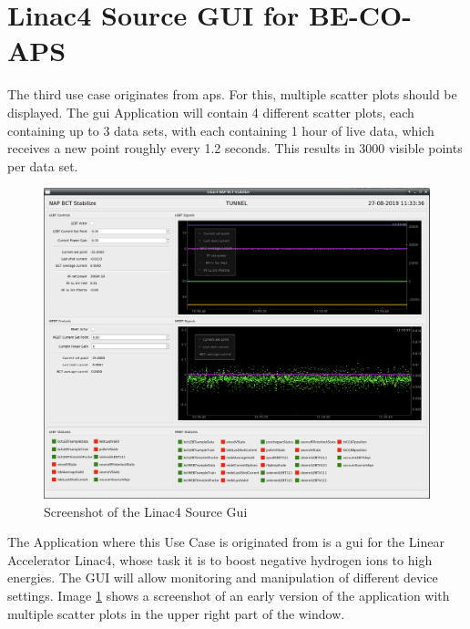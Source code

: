 \section{Linac4 Source GUI for BE-CO-APS}
\label{sec:usecases:linac}

The third use case originates from \gls{aps}. For this, multiple scatter plots
should be displayed. The \gls{gui} Application will contain 4 different scatter
plots, each containing up to 3 data sets, with each containing 1 hour of live
data, which receives a new point roughly every 1.2 seconds. This results in 3000
visible points per data set.

\begin{figure}[h]
    \centering
    \includegraphics[width=15cm]{resources/img/Linac4SourceGui}
    \caption{Screenshot of the Linac4 Source Gui}
    \label{fig:linac4sourcegui}
\end{figure}

The Application where this Use Case is originated from is a \gls{gui} for the
Linear Accelerator Linac4, whose task it is to boost negative hydrogen ions to
high energies. The GUI will allow monitoring and manipulation of different
device settings. Image \ref{fig:linac4sourcegui} shows a screenshot of an early
version of the application with multiple scatter plots in the upper right part
of the window.
\cite{LinacFour, LinacFourGuiPres}

